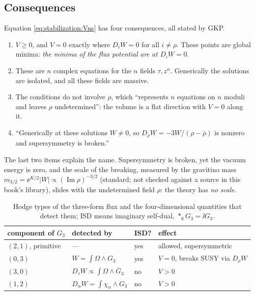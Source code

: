 \subsection{Consequences}

Equation \eqref{eq:stabilization:Vns} has four consequences, all stated by GKP.
\begin{enumerate}[leftmargin=*,itemsep=1pt]
\item $V\ge0$, and $V=0$ exactly where $D_iW=0$ for all $i\neq\rho$. These points are global
 minima: \emph{the minima of the flux potential are at $D_iW=0$}.
\item These are $n$ complex equations for the $n$ fields $\tau,z^\alpha$. Generically the
 solutions are isolated, and all these fields are massive.
\item The conditions do not involve $\rho$, which ``represents $n$ equations on $n$ moduli and
 leaves $\rho$ undetermined'': the volume is a flat direction with $V=0$ along it.
\item ``Generically at these solutions $W\neq0$, so $D_\rho W=-3W/(\rho-\bar\rho)$ is nonzero
 and supersymmetry is broken.''
\end{enumerate}
The last two items explain the name. Supersymmetry is broken, yet the vacuum energy is zero,
and the scale of the breaking, measured by the gravitino mass $m_{3/2}=\ee^{K/2}|W|\propto
(\operatorname{Im}\rho)^{-3/2}$ (standard; not checked against a source in this book's
library), slides with the undetermined field $\rho$: the theory has \emph{no scale}.

\begin{table}[t]
\centering\small
\begin{tabular}{@{}llll@{}}
\toprule
component of $G_3$ & detected by & ISD? & effect\\
\midrule
$(2,1)$, primitive & --- & yes & allowed, supersymmetric\\
$(0,3)$ & $W=\int\Omega\wedge G_3$ & yes & $V=0$, breaks SUSY via $D_\rho W$\\
$(3,0)$ & $D_\tau W\propto\int\Omega\wedge\bar G_3$ & no & $V>0$\\
$(1,2)$ & $D_\alpha W=\int\chi_\alpha\wedge G_3$ & no & $V>0$\\
\bottomrule
\end{tabular}
\caption{Hodge types of the three-form flux and the four-dimensional quantities that detect
them; ISD means imaginary self-dual, $\ast_6G_3=\ii G_3$. }\label{tab:stabilization:hodge}
\end{table}

